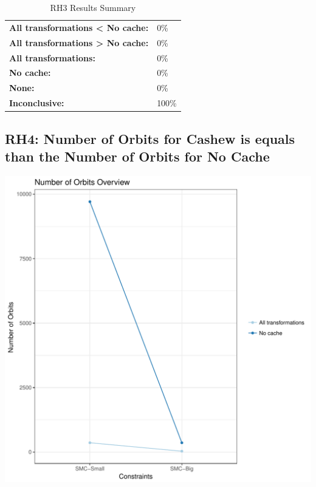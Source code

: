 \documentclass{article}\usepackage[]{graphicx}\usepackage[]{color}
\makeatletter
\def\maxwidth{ %
  \ifdim\Gin@nat@width>\linewidth
    \linewidth
  \else
    \Gin@nat@width
  \fi
}
\newenvironment{knitrout}{}{} %
\makeatother
\begin{document}
	\begin{table}[H]
	\centering
	\caption{RH3 Results Summary}
	\begin{tabular}{ll}
	\textbf{All transformations \textless{} No cache:}& 0\% \\
	\textbf{All transformations \textgreater{} No cache:}& 0\%\\
	\textbf{All transformations:} & 0\%\\
	\textbf{No cache:} & 0\%\\
	\textbf{None:}& 0\%\\
	\textbf{Inconclusive:}& 100\%
			
	
	\end{tabular}
	\end{table}
	
	
	



\subsection{RH4: Number of Orbits for Cashew is equals than the Number of Orbits for No Cache}


 
\begin{knitrout}
\color{fgcolor}
\includegraphics[width=\maxwidth]{figure/overview_RH4-1} 

\end{knitrout}
 	
\end{document}
